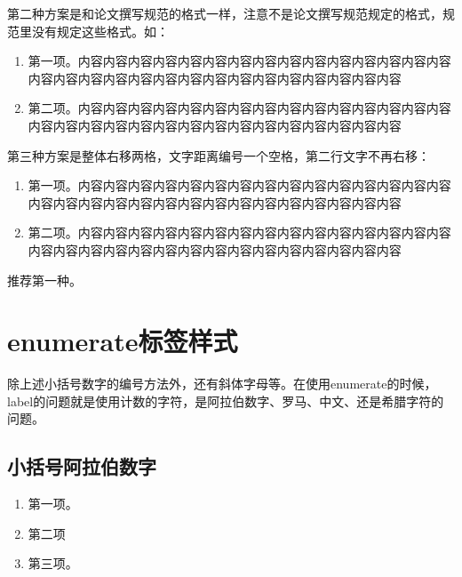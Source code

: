 第二种方案是和论文撰写规范的格式一样，注意不是论文撰写规范规定的格式，规范里没有规定这些格式。如：
\begin{enumerate}[topsep = 0 pt, itemsep= 0 pt, parsep=0pt, partopsep=0pt, leftmargin=0pt, itemindent=44pt, labelsep=6pt, listparindent=24pt, label=(\arabic*)]
	\item 第一项。内容内容内容内容内容内容内容内容内容内容内容内容内容内容内容内容内容内容内容内容内容内容内容内容内容内容内容内容内容内容

	\item 第二项。内容内容内容内容内容内容内容内容内容内容内容内容内容内容内容内容内容内容内容内容内容内容内容内容内容内容内容内容内容内容
	
\end{enumerate}

第三种方案是整体右移两格，文字距离编号一个空格，第二行文字不再右移：
\begin{enumerate}[topsep = 0 pt, itemsep= 0 pt, parsep=0pt, partopsep=0pt, leftmargin=24pt, itemindent=20pt, labelsep=6pt, listparindent=20pt, label=(\arabic*)]
	\item 第一项。内容内容内容内容内容内容内容内容内容内容内容内容内容内容内容内容内容内容内容内容内容内容内容内容内容内容内容内容内容内容

	\item 第二项。内容内容内容内容内容内容内容内容内容内容内容内容内容内容内容内容内容内容内容内容内容内容内容内容内容内容内容内容内容内容
	
\end{enumerate}

推荐第一种。

\section{enumerate标签样式}
除上述小括号数字的编号方法外，还有斜体字母等。在使用enumerate的时候，label的问题就是使用计数的字符，是阿拉伯数字、罗马、中文、还是希腊字符的问题。

\subsection{小括号阿拉伯数字}
\begin{enumerate}[topsep = 0 pt, itemsep= 0 pt, parsep=0pt, partopsep=0pt, leftmargin=0pt, itemindent=44pt, labelsep=6pt, listparindent=24pt, label=\arabic*)]
	\item 第一项。

	\item 第二项
	
	\item 第三项。
	
\end{enumerate}



